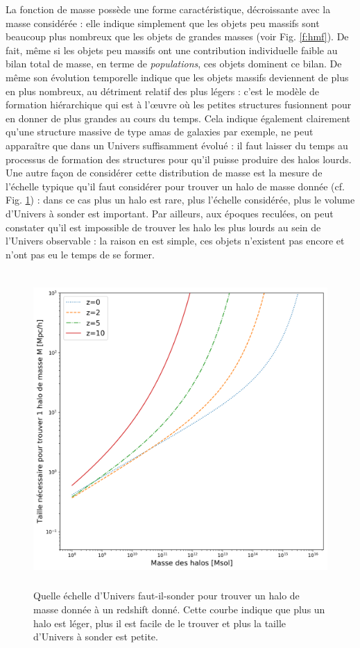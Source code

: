 La fonction de masse possède une forme caractéristique, décroissante avec la masse considérée : elle indique simplement que les objets peu massifs sont beaucoup plus nombreux que les objets de grandes masses (voir Fig. \ref{f:hmf}). De fait, même si les objets peu massifs ont une contribution individuelle faible au bilan total de masse, en terme de \textit{populations}, ces objets dominent ce bilan. De même son évolution temporelle indique que les objets massifs deviennent de plus en plus nombreux, au détriment relatif des plus légers : c'est le modèle de formation hiérarchique qui est à l'œuvre où les petites structures fusionnent pour en donner de plus grandes au cours du temps. Cela indique également clairement qu'une structure massive de type amas de galaxies par exemple, ne peut apparaître que dans un Univers suffisamment évolué : il faut laisser du temps au processus de formation des structures pour qu'il puisse produire des halos lourds. Une autre façon de considérer cette distribution de masse est la mesure de l'échelle typique qu'il faut considérer pour trouver un halo de masse donnée (cf. Fig. \ref{f:L}) : dans ce cas plus un halo est rare, plus l'échelle considérée, plus le volume d'Univers à sonder est important. Par ailleurs, aux époques reculées, on peut constater qu'il est impossible de trouver les halo les plus lourds au sein de l'Univers observable : la raison en est simple, ces objets n'existent pas encore et n'ont pas eu le temps de se former.

\begin{figure}[htbp]
	\centering
		\includegraphics[height=12cm]{figs/L.png}
	\caption[Quelle échelle d'Univers faut-il-sonder pour trouver un halo de masse donnée à une époque donnée]{Quelle échelle d'Univers faut-il-sonder pour trouver un halo de masse donnée à un redshift donné. Cette courbe indique que plus un halo est léger, plus il est facile de le trouver et plus la taille d'Univers à sonder est petite.} 
	\label{f:L}
\end{figure}

